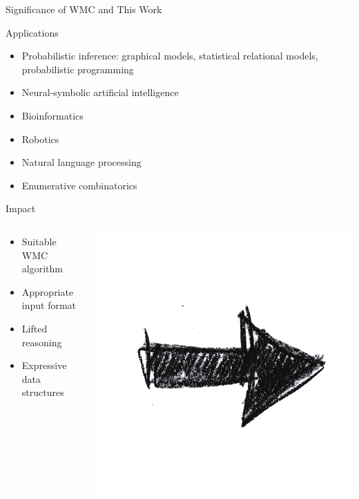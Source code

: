 \documentclass{beamer}
\begin{document}
\begin{frame}{Significance of WMC and This Work}
  \begin{block}{Applications}
  \begin{itemize}
    \item Probabilistic inference: graphical models, statistical relational models, probabilistic programming
    \item Neural-symbolic artificial intelligence
    \item Bioinformatics
    \item Robotics
    \item Natural language processing
    \item Enumerative combinatorics
  \end{itemize}
  \end{block}
  \begin{block}{Impact}
    \begin{columns}
      \begin{column}{0.50\textwidth}
        \begin{itemize}
          \item Suitable WMC algorithm
          \item Appropriate input format
          \item Lifted reasoning
          \item Expressive data structures
        \end{itemize}
      \end{column}
      \begin{column}{0.1\textwidth}
        \centering
        \includegraphics[width=\textwidth]{arrow.png}

\end{column}
\end{columns}
\end{block}
\end{frame}
\end{document}
